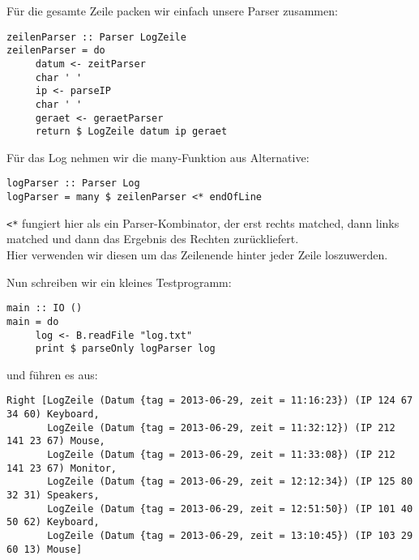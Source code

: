 \documentclass{beamer}
\begin{document}
\begin{frame}[fragile]
Für die gesamte Zeile packen wir einfach unsere Parser zusammen:
\small
\begin{verbatim}
zeilenParser :: Parser LogZeile
zeilenParser = do
     datum <- zeitParser
     char ' '
     ip <- parseIP
     char ' '
     geraet <- geraetParser
     return $ LogZeile datum ip geraet
\end{verbatim}
\normalsize
\end{frame}

\begin{frame}[fragile]
Für das Log nehmen wir die many-Funktion aus \glqq Alternative\grqq :
\begin{verbatim}
logParser :: Parser Log
logParser = many $ zeilenParser <* endOfLine
\end{verbatim}
\texttt{<*} fungiert hier als ein Parser-Kombinator, der erst rechts matched, dann links matched und dann das Ergebnis des Rechten zurückliefert.\\
Hier verwenden wir diesen um das Zeilenende hinter jeder Zeile loszuwerden.
\end{frame}

\begin{frame}[fragile]
Nun schreiben wir ein kleines Testprogramm:
\begin{verbatim}
main :: IO ()
main = do
     log <- B.readFile "log.txt"
     print $ parseOnly logParser log
\end{verbatim}
und führen es aus:
\tiny
\begin{verbatim}
Right [LogZeile (Datum {tag = 2013-06-29, zeit = 11:16:23}) (IP 124 67 34 60) Keyboard,
       LogZeile (Datum {tag = 2013-06-29, zeit = 11:32:12}) (IP 212 141 23 67) Mouse,
       LogZeile (Datum {tag = 2013-06-29, zeit = 11:33:08}) (IP 212 141 23 67) Monitor,
       LogZeile (Datum {tag = 2013-06-29, zeit = 12:12:34}) (IP 125 80 32 31) Speakers,
       LogZeile (Datum {tag = 2013-06-29, zeit = 12:51:50}) (IP 101 40 50 62) Keyboard,
       LogZeile (Datum {tag = 2013-06-29, zeit = 13:10:45}) (IP 103 29 60 13) Mouse]
\end{verbatim}
\normalsize

\end{frame}
\end{document}
